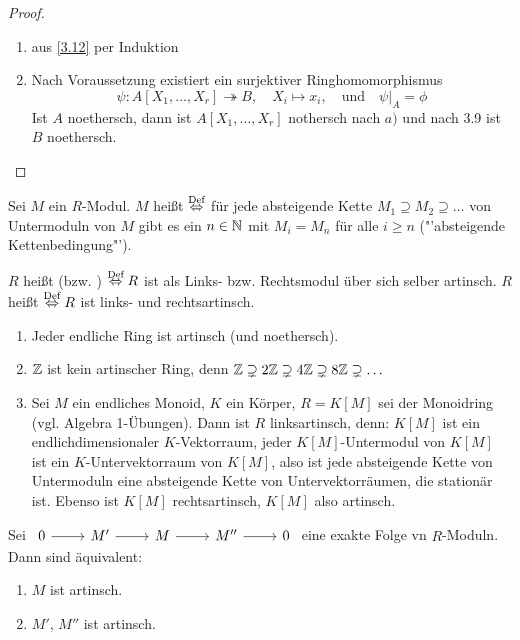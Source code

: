 \begin{proof}
	\begin{enumerate}[label= \alph*)]
		\item aus \ref{3.12} per Induktion
		\item Nach Voraussetzung existiert ein surjektiver Ringhomomorphismus 
		$$\psi: A[X_1, \ldots, X_r] \twoheadrightarrow B, \quad X_i \mapsto x_i, \quad \text{und} \quad \psi\big|_A = \phi$$
		Ist $A$ noethersch, dann ist $A[X_1, \ldots, X_r]$ nothersch nach $a)$ und nach 3.9 ist $B$ noethersch.
	\end{enumerate}
\end{proof}
\begin{df}\label{3.14}
	Sei $M$ ein $R$-Modul. $M$ heißt  $\overset{\text{Def}}{\Leftrightarrow}$ für jede absteigende Kette $M_1 \supseteq M_2 \supseteq \ldots$ von Untermoduln von $M$ gibt es ein $n\in \mathbb{N}$ mit $M_i = M_n$ für alle $i\geq n$ ("'absteigende Kettenbedingung"').
\end{df}
\begin{df}\label{df3.15}
	$R$ heißt  (bzw. ) $\overset{\text{Def}}{\Leftrightarrow} R$ ist als Links- bzw. Rechtsmodul über sich selber artinsch. $R$ heißt  $\overset{\text{Def}}{\Leftrightarrow} R$ ist links- und rechtsartinsch.
\end{df}
\begin{bsp}
	\begin{enumerate}[label= \alph*)]
		\item Jeder endliche Ring ist artinsch (und noethersch).
		\item $\mathbb{Z}$ ist kein artinscher Ring, denn $\mathbb{Z} \supsetneq 2\mathbb{Z}\supsetneq 4 \mathbb{Z} \supsetneq 8\mathbb{Z} \supsetneq \ldots$
		\item Sei $M$ ein endliches Monoid, $K$ ein Körper, $R= K[M]$ sei der Monoidring (vgl. Algebra 1-Übungen). Dann ist $R$ linksartinsch, denn: $K[M]$ ist ein endlichdimensionaler $K$-Vektorraum, jeder $K[M]$-Untermodul von $K[M]$ ist ein $K$-Untervektorraum von $K[M]$, also ist jede absteigende Kette von Untermoduln eine absteigende Kette von Untervektorräumen, die stationär ist. Ebenso ist $K[M]$ rechtsartinsch, $K[M]$ also artinsch.
	\end{enumerate}
\end{bsp}
\begin{bem}\label{3.17}
	Sei $\begin{tikzcd}
	0 \arrow{r} & M' \arrow{r} & M\arrow{r}  & M'' \arrow{r} & 0
	\end{tikzcd}$ eine exakte Folge vn $R$-Moduln. Dann sind äquivalent:
	\begin{enumerate}[label= \roman*)]
		\item $M$ ist artinsch.
		\item $M'$, $M''$ ist artinsch.
	\end{enumerate}
\end{bem}

